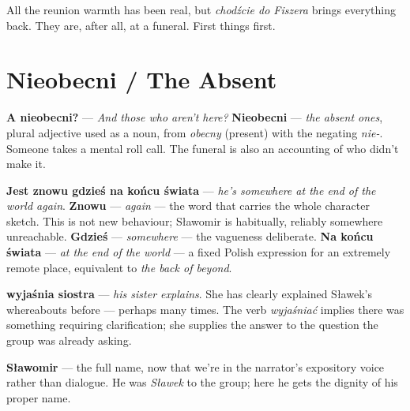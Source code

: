 All the reunion warmth has been real, but \textit{chodźcie do Fiszera}
brings everything back. They are, after all, at a funeral. First things
first.

\section{Nieobecni / The Absent}


\textbf{A nieobecni?} --- \textit{And those who aren't here?}
\textbf{Nieobecni} --- \textit{the absent ones}, plural adjective used
as a noun, from \textit{obecny} (present) with the negating
\textit{nie-}. Someone takes a mental roll call. The funeral is also
an accounting of who didn't make it.

\textbf{Jest znowu gdzieś na końcu świata} --- \textit{he's somewhere
at the end of the world again}. \textbf{Znowu} --- \textit{again} ---
the word that carries the whole character sketch. This is not new
behaviour; Sławomir is habitually, reliably somewhere unreachable.
\textbf{Gdzieś} --- \textit{somewhere} --- the vagueness deliberate.
\textbf{Na końcu świata} --- \textit{at the end of the world} --- a
fixed Polish expression for an extremely remote place, equivalent to
\textit{the back of beyond}.

\textbf{wyjaśnia siostra} --- \textit{his sister explains}. She has
clearly explained Sławek's whereabouts before --- perhaps many times.
The verb \textit{wyjaśniać} implies there was something requiring
clarification; she supplies the answer to the question the group was
already asking.



\textbf{Sławomir} --- the full name, now that we're in the narrator's
expository voice rather than dialogue. He was \textit{Sławek} to the
group; here he gets the dignity of his proper name.

